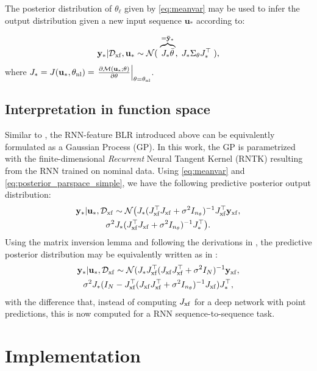 \documentclass{article}
\newcommand{\nsamp}{{N}}
\newcommand{\npar}{{n_\theta}}
\newcommand{\M}{\mathcal{M}}
\newcommand{\N}{\mathcal{N}} %
\newcommand{\D}{\mathcal{D}}
\newcommand{\transf}{{\rm{xf}}}
\newcommand{\lin}{{\ell}}
\newcommand{\nominal}{{\rm{nl}}}
\newcommand{\tvec}[1]{{\mathbf{#1}}}
\begin{document}
The posterior distribution of $\theta_\lin$ given by \eqref{eq:meanvar} may be used to infer the output distribution given a new input sequence $\tvec{u}_*$ according to:

\begin{equation}
    \label{eq:posterior_parspace_simple}
   \tvec{y}_* | \D_\transf, \tvec{u}_* \sim \N(\;\overbrace{J_* \bar{\theta}}^{=\tvec{\bar{y}}_*},\; J_* \Sigma_{\theta} J_*^\top\;),
\end{equation}
where $J_* = J(\tvec{u}_*, \theta_\nominal) = \left . \frac{\partial \M(\tvec{u_*}; \theta)}{\partial \theta} \right |_{\theta = \theta_\nominal}$.

\subsection{Interpretation in function space}
\label{sec:funspace_interp}
Similar to \cite{maddox2021fast}, the RNN-feature BLR introduced above can be equivalently formulated as a Gaussian Process (GP). In this work, the GP is parametrized with the finite-dimensional \emph{Recurrent} Neural Tangent Kernel (RNTK) resulting from the RNN trained on nominal data. Using \eqref{eq:meanvar} and \eqref{eq:posterior_parspace_simple}, we have the following predictive posterior output distribution:
\begin{multline}
\label{eq:posterior_parspace_full}
 \tvec{y}_* | \tvec{u}_*, \D_\transf \sim \N\big(J_* (J^\top_\transf J_\transf + \sigma^2 I_\npar)^{-1}J^\top_\transf \tvec{y}_\transf, \\
 \sigma^2 J_* (J_\transf^\top J_\transf + \sigma^2 I_\npar)^{-1} J_*^\top\big).
\end{multline}
Using the matrix inversion lemma and following the derivations in  \cite[Chapter~1]{rasmussen2006gaussian}, the predictive posterior distribution may be equivalently written as in \cite[Equation 3]{maddox2021fast}:
\begin{multline}
\label{eq:posterior_funspace}
 \tvec{y}_* | \tvec{u}_*, \D_\transf \sim \N(
 J_* J_\transf^\top(J_\transf J_\transf^\top + \sigma^2 I_\nsamp)^{-1}\tvec{y}_\transf, \\
 \sigma^2 J_*(I_\nsamp - J_\transf^\top(J_\transf J_\transf^\top + \sigma^2 I_{\npar})^{-1} 
 J_\transf)J_*^\top,
\end{multline}
with the difference that, instead of computing $J_\transf$ for a deep network with point predictions, this is now computed for a RNN sequence-to-sequence task. 

\section{Implementation}
\label{sec:implementation}
\end{document}
